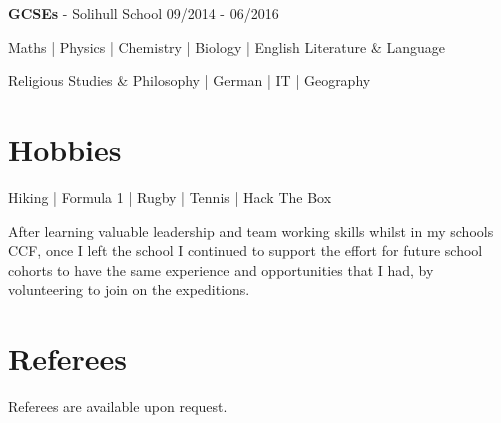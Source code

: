 \documentclass{article}
\begin{document}
\textbf{GCSEs} - Solihull School \hfill 09/2014 - 06/2016
\begin{center}
Maths | Physics | Chemistry | Biology | English Literature \& Language

Religious Studies \& Philosophy | German | IT | Geography
\end{center}

\section*{Hobbies}

\begin{center}
Hiking | Formula 1 | Rugby | Tennis | Hack The Box
\end{center}

After learning valuable leadership and team working skills whilst in my schools CCF, once I left the school I continued to support the effort for future school cohorts to have the same experience and opportunities that I had, by volunteering to join on the expeditions.

\section*{Referees}

Referees are available upon request.
\end{document}
